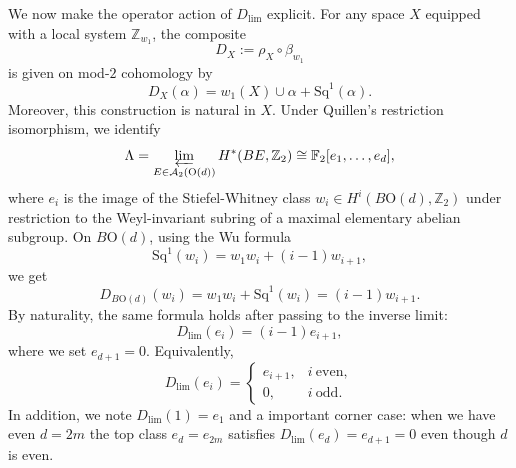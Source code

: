 \documentclass[aps,prx,reprint,superscriptaddress,twocolumn,amsmath,amssymb,amsfonts, nofootinbib]{revtex4-2}
\newcommand{\Sq}{\text{Sq}}
\newcommand{\Z}{\mathbb{Z}}
\theoremstyle{apsstyle}
\begin{document}
\bigskip

We now make the operator action of $D_{\lim}$ explicit. For any space $X$ equipped with a local system $\Z_{w_1}$, the composite
\begin{equation}
D_X:=\rho_X\circ \beta_{w_1}
\end{equation}
is given on mod-$2$ cohomology by
\begin{equation}
D_X(\alpha)=w_1(X)\cup \alpha+\Sq^1(\alpha).
\label{eq:def_DX_w1_Sq1}
\end{equation}
Moreover, this construction is natural in $X$. Under Quillen's restriction isomorphism, we identify
\begin{equation}
\Lambda = \varprojlim_{E\in\mathcal A_2(\mathrm{O}(d))}H^*(BE,\Z_2) \cong \mathbb F_2[e_1,\dots,e_d],
\end{equation}
where $e_i$ is the image of the Stiefel-Whitney class $w_i\in H^i(B\mathrm{O}(d),\Z_2)$ under restriction to the Weyl-invariant subring of a maximal elementary abelian subgroup. On $B\mathrm{O}(d)$, using the Wu formula
\begin{equation}
\Sq^1(w_i)=w_1w_i+(i-1)w_{i+1},
\end{equation}
we get
\begin{equation}
D_{B\mathrm{O}(d)}(w_i) = w_1w_i+\Sq^1(w_i) = (i-1)w_{i+1}.
\end{equation}
By naturality, the same formula holds after passing to the inverse limit:
\begin{equation}
D_{\lim}(e_i) = (i-1)e_{i+1},
\label{eq:Dlim_on_ei}
\end{equation}
where we set $e_{d+1}=0$. Equivalently,
\begin{equation}
D_{\lim}(e_i) = \begin{cases}
e_{i+1}, & i\ \mathrm{even},\\
0, & i\ \mathrm{odd}.
\end{cases}
\end{equation}
In addition, we note $D_{\lim}(1)=e_1$ and a important corner case: when we have even $d=2m$ the top class $e_d=e_{2m}$ satisfies $D_{\lim}(e_d)=e_{d+1}=0$ even though $d$ is even.

\bigskip 
\end{document}

